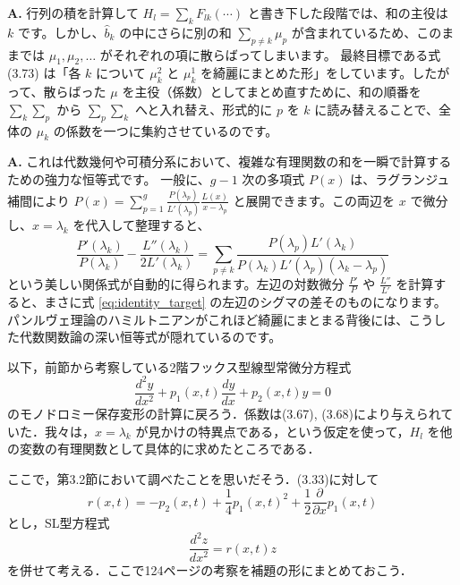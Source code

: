 \begin{Q}
\textbf{A.} 行列の積を計算して $H_l = \sum_k F_{lk} (\cdots)$ と書き下した段階では、和の主役は $k$ です。しかし、$\hat{b}_k$ の中にさらに別の和 $\sum_{p \neq k} \mu_p$ が含まれているため、このままでは $\mu_1, \mu_2, \dots$ がそれぞれの項に散らばってしまいます。
最終目標である式 (3.73) は「各 $k$ について $\mu_k^2$ と $\mu_k^1$ を綺麗にまとめた形」をしています。したがって、散らばった $\mu$ を主役（係数）としてまとめ直すために、和の順番を $\sum_k \sum_p$ から $\sum_p \sum_k$ へと入れ替え、形式的に $p$ を $k$ に読み替えることで、全体の $\mu_k$ の係数を一つに集約させているのです。
\end{Q}

\begin{Q}
\textbf{A.} これは代数幾何や可積分系において、複雑な有理関数の和を一瞬で計算するための強力な恒等式です。
一般に、$g-1$ 次の多項式 $P(x)$ は、ラグランジュ補間により $P(x) = \sum_{p=1}^g \frac{P(\lambda_p)}{L'(\lambda_p)} \frac{L(x)}{x-\lambda_p}$ と展開できます。この両辺を $x$ で微分し、$x = \lambda_k$ を代入して整理すると、
\begin{equation*}
    \frac{P'(\lambda_k)}{P(\lambda_k)} - \frac{L''(\lambda_k)}{2L'(\lambda_k)} = \sum_{p \neq k} \frac{P(\lambda_p)L'(\lambda_k)}{P(\lambda_k)L'(\lambda_p)(\lambda_k-\lambda_p)}
\end{equation*}
という美しい関係式が自動的に得られます。左辺の対数微分 $\frac{P'}{P}$ や $\frac{L''}{L'}$ を計算すると、まさに式 \eqref{eq:identity_target} の左辺のシグマの差そのものになります。パンルヴェ理論のハミルトニアンがこれほど綺麗にまとまる背後には、こうした代数関数論の深い恒等式が隠れているのです。
\end{Q}

\begin{story}

以下，前節から考察している2階フックス型線型常微分方程式
\begin{equation}
    \frac{d^2 y}{dx^2} + p_1(x,t) \frac{dy}{dx} + p_2(x,t)y = 0
\end{equation}
のモノドロミー保存変形の計算に戻ろう．係数は(3.67), (3.68)により与えられていた．我々は，$x=\lambda_k$ が見かけの特異点である，という仮定を使って，$H_l$ を他の変数の有理関数として具体的に求めたところである．

ここで，第3.2節において調べたことを思いだそう．(3.33)に対して
\begin{equation}
    r(x,t) = -p_2(x,t) + \frac{1}{4}p_1(x,t)^2 + \frac{1}{2}\frac{\partial}{\partial x}p_1(x,t)
\end{equation}
とし，SL型方程式
\begin{equation}
    \frac{d^2 z}{dx^2} = r(x,t)z
\end{equation}
を併せて考える．ここで124ページの考察を補題の形にまとめておこう．
\end{story}

